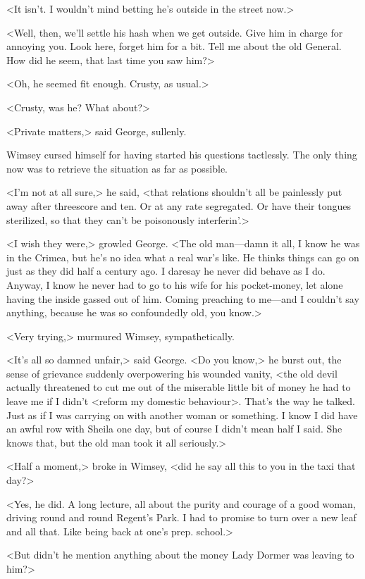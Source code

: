 <It isn't. I wouldn't mind betting he's outside in the street now.>

<Well, then, we'll settle his hash when we get outside. Give him in charge for annoying you. Look here, forget him for a bit. Tell me about the old General. How did he seem, that last time you saw him?>

<Oh, he seemed fit enough. Crusty, as usual.>

<Crusty, was he? What about?>

<Private matters,> said George, sullenly.

Wimsey cursed himself for having started his questions tactlessly. The only thing now was to retrieve the situation as far as possible.

<I'm not at all sure,> he said, <that relations shouldn't all be painlessly put away after threescore and ten. Or at any rate segregated. Or have their tongues sterilized, so that they can't be poisonously interferin'.>

<I wish they were,> growled George. <The old man—damn it all, I know he was in the Crimea, but he's no idea what a real war's like. He thinks things can go on just as they did half a century ago. I daresay he never did behave as I do. Anyway, I know he never had to go to his wife for his pocket-money, let alone having the inside gassed out of him. Coming preaching to me—and I couldn't say anything, because he was so confoundedly old, you know.>

<Very trying,> murmured Wimsey, sympathetically.

<It's all so damned unfair,> said George. <Do you know,> he burst out, the sense of grievance suddenly overpowering his wounded vanity, <the old devil actually threatened to cut me out of the miserable little bit of money he had to leave me if I didn't <reform my domestic behaviour>. That's the way he talked. Just as if I was carrying on with another woman or something. I know I did have an awful row with Sheila one day, but of course I didn't mean half I said. She knows that, but the old man took it all seriously.>

<Half a moment,> broke in Wimsey, <did he say all this to you in the taxi that day?>

<Yes, he did. A long lecture, all about the purity and courage of a good woman, driving round and round Regent's Park. I had to promise to turn over a new leaf and all that. Like being back at one's prep. school.>

<But didn't he mention anything about the money Lady Dormer was leaving to him?>

